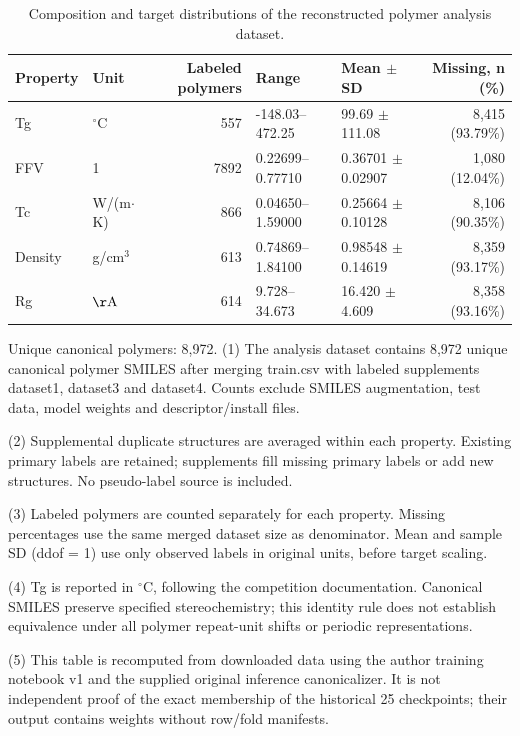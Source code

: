 \begin{table}[htbp]
\centering
\caption{Composition and target distributions of the reconstructed polymer analysis dataset.}
\label{tab:dataset-composition}
\begin{tabular}{llrllr}
\hline
Property & Unit & Labeled polymers & Range & Mean $\pm$ SD & Missing, n (\%) \\
\hline
Tg & $^\circ$C & 557 & -148.03--472.25 & 99.69 $\pm$ 111.08 & 8,415 (93.79\%) \\
FFV & 1 & 7892 & 0.22699--0.77710 & 0.36701 $\pm$ 0.02907 & 1,080 (12.04\%) \\
Tc & W/(m$\cdot$K) & 866 & 0.04650--1.59000 & 0.25664 $\pm$ 0.10128 & 8,106 (90.35\%) \\
Density & g/cm$^3$ & 613 & 0.74869--1.84100 & 0.98548 $\pm$ 0.14619 & 8,359 (93.17\%) \\
Rg & $\mathrm{\AA}$ & 614 & 9.728--34.673 & 16.420 $\pm$ 4.609 & 8,358 (93.16\%) \\
\hline
\end{tabular}
\begin{minipage}{\linewidth}
\footnotesize
Unique canonical polymers: 8,972.
(1) The analysis dataset contains 8,972 unique canonical polymer SMILES after merging train.csv with labeled supplements dataset1, dataset3 and dataset4. Counts exclude SMILES augmentation, test data, model weights and descriptor/install files.\par
(2) Supplemental duplicate structures are averaged within each property. Existing primary labels are retained; supplements fill missing primary labels or add new structures. No pseudo-label source is included.\par
(3) Labeled polymers are counted separately for each property. Missing percentages use the same merged dataset size as denominator. Mean and sample SD (ddof = 1) use only observed labels in original units, before target scaling.\par
(4) Tg is reported in $^\circ$C, following the competition documentation. Canonical SMILES preserve specified stereochemistry; this identity rule does not establish equivalence under all polymer repeat-unit shifts or periodic representations.\par
(5) This table is recomputed from downloaded data using the author training notebook v1 and the supplied original inference canonicalizer. It is not independent proof of the exact membership of the historical 25 checkpoints; their output contains weights without row/fold manifests.\par
\end{minipage}
\end{table}

